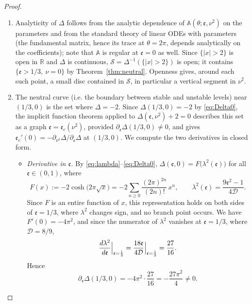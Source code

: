 \documentclass[10pt,a4paper]{amsart}
\newcommand{\D}{\mathcal{D}}
\newcommand{\ee}{\mathfrak{e}}
\begin{document}
\begin{proof}
\begin{enumerate}
    \item [(i)] Analyticity of $\Delta$ follows from the analytic dependence of $\mathbb A(\theta;\ee,\nu^2)$ on the parameters and from the standard theory of linear ODEs with parameters (the fundamental matrix, hence its trace at $\theta=2\pi$, depends analytically on the coefficients); note that $\mathbb A$ is regular at $\ee=0$ as well. Since $\{|x|>2\}$ is open in $\mathbb R$ and $\Delta$ is continuous, $\mathcal S=\Delta^{-1}(\{|x|>2\})$ is open; it contains $\{\ee>1/3,\ \nu=0\}$ by Theorem~\ref{thm:neutral}. Openness gives, around each such point, a small disc contained in $\mathcal S$, in particular a vertical segment in $\nu^2$.
\item[(ii)] The neutral curve (i.e. the boundary between stable and unstable levels) near $(1/3,0)$ is the set where $\Delta=-2$. Since $\Delta(1/3,0)=-2$ by \eqref{eq:Delta0}, the implicit function theorem applied to $\Delta(\ee,\nu^2)+2=0$ describes this set as a graph $\ee=\ee_c(\nu^2)$, provided $\partial_\ee\Delta(1/3,0)\neq0$, and gives $\ee_c'(0)=-\partial_{\nu^2}\Delta/\partial_\ee\Delta$ at $(1/3,0)$. We compute the two derivatives in closed form.
\begin{itemize}
\item \emph{Derivative in $\ee$.} By \eqref{eq:lambda}--\eqref{eq:Delta0}, $\Delta(\ee,0)=F\big(\lambda^2(\ee)\big)$ for all $\ee\in(0,1)$, where
\[
F(x):=-2\cosh\big(2\pi\sqrt x\big)=-2\sum_{n\ge0}\frac{(2\pi)^{2n}}{(2n)!}\,x^{n},\qquad \lambda^2(\ee)=\frac{9\ee^2-1}{4\D}.
\]
Since $F$ is an entire function of $x$, this representation holds on both sides of $\ee=1/3$, where $\lambda^2$ changes sign, and no branch point occurs. We have $F'(0)=-4\pi^2$, and since the numerator of $\lambda^2$ vanishes at $\ee=1/3$, where $\D=8/9$,
\[
\frac{{\rm d}\lambda^2}{{\rm d}\ee}\Big|_{\ee=\frac{1}{3}}=\frac{18\ee}{4\D}\Big|_{\ee=\frac{1}{3}}=\frac{27}{16}.
\]
Hence
\begin{equation}\label{eq:dDde}
\partial_\ee\Delta(1/3,0)=-4\pi^2\cdot\frac{27}{16}=-\frac{27\pi^2}{4}\neq0 .
\end{equation}





\end{itemize}
\end{enumerate}
\end{proof}
\end{document}
